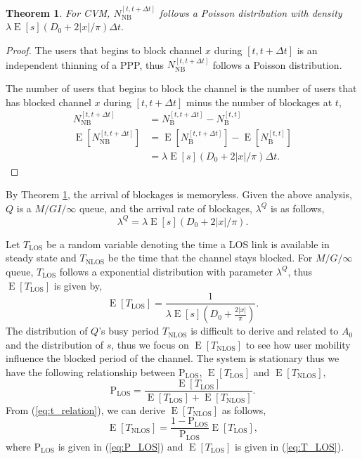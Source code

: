 \documentclass[10pt, conference, letterpaper]{IEEEtran}
\newtheorem{theorem}{Theorem}
\DeclareMathOperator*{\E}{\mathrm{E}}
\DeclareMathOperator*{\LOS}{\mathrm{LOS}}
\DeclareMathOperator*{\NLOS}{\mathrm{NLOS}}
\begin{document}
\begin{theorem}\label{theorem:poisson_arrival}
For CVM, $N_{\mathrm{NB}}^{[t, t+\Delta t]}$ follows a Poisson distribution with density $\lambda\E[s](D_0 + 2|x|/\pi)\Delta t.$
\end{theorem}
\begin{proof}
The users that begins to block channel $x$ during $[t, t+\Delta t]$ is an independent thinning of a PPP, thus $N_{\mathrm{NB}}^{[t, t+\Delta t]}$ follows a Poisson distribution. 

The number of users that begins to block the channel is the number of users that has blocked channel $x$ during $[t, t+\Delta t]$ minus the number of blockages at $t$,  
\begin{equation*}
\begin{aligned}
N_{\mathrm{NB}}^{[t, t+\Delta t]} & = N_\mathrm{B}^{[t, t+\Delta t]} - N_\mathrm{B}^{[t, t]} \\
\E[N_{\mathrm{NB}}^{[t, t+\Delta t]}] & = \E[N_\mathrm{B}^{[t, t+\Delta t]}] - \E[N_\mathrm{B}^{[t, t]}] \\
									  & = \lambda\E[s](D_0 + 2|x|/\pi)\Delta t.
\end{aligned}
\end{equation*}
\end{proof}

By Theorem \ref{theorem:poisson_arrival}, the arrival of blockages is memoryless.  Given the above analysis, $Q$ is a $M/GI/\infty$ queue,  and the arrival rate of blockages, $\lambda^Q$ is as follows,
\begin{equation}\label{eq:lambda_queue}
\lambda^Q = \lambda\E[s](D_0 + 2|x|/\pi).
\end{equation} 

Let $T_{\mathrm{LOS}}$ be a random variable denoting the time a LOS link is available in steady state and $T_{\mathrm{NLOS}}$ be the time that the channel stays blocked. For $M/G/\infty$ queue, $T_{\mathrm{LOS}}$ follows a exponential distribution with parameter $\lambda^Q$, thus $\E[T_{\mathrm{LOS}}]$ is given by, 
\begin{equation}\label{eq:T_LOS}
\E[T_{\mathrm{LOS}}] = \frac{1}{\lambda\E[s](D_0 + \frac{2|x|}{\pi})}.
\end{equation}
The distribution of $Q$'s busy period $T_{\NLOS}$ is difficult to derive and related to $A_0$ and the distribution of $s$, thus we focus on $\E[T_{\mathrm{NLOS}}]$ to see how user mobility influence the blocked period of the channel. The system is stationary thus we have the following relationship between $\mathrm{P}_{\LOS}$, $\E[T_{\LOS}]$ and $\E[T_{\NLOS}]$, 
\begin{equation}\label{eq:t_relation}
\mathrm{P}_{\LOS} = \frac{\E[T_{\LOS}]}{\E[T_{\LOS}] + \E[T_{\NLOS}]}.
\end{equation}
From (\ref{eq:t_relation}), we can derive $\E[T_{\NLOS}]$ as follows, 
\begin{equation*}\label{eq:T_NLOS}
\E[T_{\NLOS}] = \frac{1-\mathrm{P}_{\LOS}}{\mathrm{P}_{\LOS}}\E[T_{\LOS}],
\end{equation*}
where $\mathrm{P}_{\LOS}$ is given in (\ref{eq:P_LOS}) and $\E[T_{\LOS}]$ is given in (\ref{eq:T_LOS}).
\end{document}
